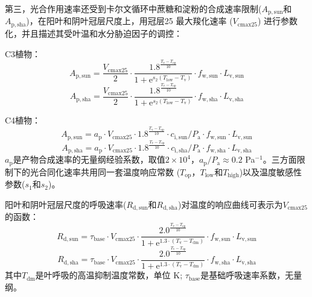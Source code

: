 第三，光合作用速率还受到卡尔文循环中蔗糖和淀粉的合成速率限制($A_{\mathrm{p,sun}}$和$A_{\mathrm{p,sha}}$)，在阳叶和阴叶冠层尺度上，用冠层25 \textcelsius 最大羧化速率 ($V_{\mathrm{cmax25}}$) 进行参数化，并且描述其受叶温和水分胁迫因子的调控：

C3植物：
\begin{equation}\label{A_e_a_sun}
A_{\mathrm{p,sun}}=\frac{V_{\mathrm{cmax 25}}}{2} \cdot \frac{1.8^{\frac{T_{\mathrm{{v }}}-T_{\mathrm{o p}}}{10}}}{1+{\mathrm e}^{s_{\mathrm{2}}\left(T_{\mathrm{{low }}}-T_{\mathrm{{v }}}\right)}} \cdot f_{\mathrm{w,sun}} \cdot L_{\mathrm{v,sun}}
\end{equation}
\begin{equation}\label{A_e_a_sha}
A_{\mathrm{p,sha}}=\frac{V_{\mathrm{cmax 25}}}{2} \cdot \frac{1.8^{\frac{T_{\mathrm{{v }}}-T_{\mathrm{o p}}}{10}}}{1+{\mathrm e}^{s_{\mathrm{2}}\left(T_{\mathrm{{low }}}-T_{\mathrm{{v }}}\right)}} \cdot f_{\mathrm{w,sha}} \cdot L_{\mathrm{v,sha}}
\end{equation}

C4植物：
\begin{equation}\label{A_e_b_sun}
A_{\mathrm{p,sun}}=a_{\mathrm{p}} \cdot V_{\mathrm{cmax 25}} \cdot 1.8^{\frac{T_{\mathrm{{v }}}-T_{\mathrm{op}}}{10}} \cdot c_{\mathrm{i,sun}}/P_{\mathrm {a}} \cdot f_{\mathrm{w,sun}} \cdot L_{\mathrm{v,sun}}
\end{equation}
\begin{equation}\label{A_e_b_sha}
A_{\mathrm{p,sha}}=a_{\mathrm{p}} \cdot V_{\mathrm{cmax 25}} \cdot 1.8^{\frac{T_{\mathrm{{v }}}-T_{\mathrm{op}}}{10}} \cdot c_{\mathrm{i,sha}}/P_{\mathrm {a}} \cdot f_{\mathrm{w,sha}} \cdot L_{\mathrm{v,sha}}
\end{equation}
$a_{\mathrm{p}}$是产物合成速率的无量纲经验系数，取值$2\times10^4$，$a_{\mathrm{p}}/P_{\mathrm {a}}\approx 0.2$ Pa$^{-1}$。三方面限制下的光合同化速率共用同一套温度响应常数 ($T_{\mathrm{op}}$，$T_{\mathrm{low}}$和$T_{\mathrm{high}}$)以及温度敏感性参数($s_1$和$s_2$)。


阳叶和阴叶冠层尺度的呼吸速率($R_{\mathrm{d,sun}}$和$R_{\mathrm{d,sha}}$)对温度的响应曲线可表示为$V_{\mathrm{cmax25}}$的函数：
\begin{equation}\label{R_d1_sun}
R_{\mathrm{d,sun}}=\tau_{\mathrm{{base }}} \cdot V_{\mathrm{cmax 25}} \cdot \frac{2.0^{\frac{T_{\mathrm{v}}-T_{\mathrm{op}}}{10}}}{1+{\mathrm e}^{1.3 \cdot\left(T_{\mathrm{v}}-T_{\mathrm{d m}}\right)}} \cdot f_{\mathrm{w,sun}} \cdot L_{\mathrm{v,sun}}
\end{equation}
\begin{equation}\label{R_d1_sha}
R_{\mathrm{d,sha}}=\tau_{\mathrm{{base }}} \cdot V_{\mathrm{cmax 25}} \cdot \frac{2.0^{\frac{T_{\mathrm{v}}-T_{\mathrm{op}}}{10}}}{1+{\mathrm e}^{1.3 \cdot\left(T_{\mathrm{v}}-T_{\mathrm{d m}}\right)}} \cdot f_{\mathrm{w,sha}} \cdot L_{\mathrm{v,sha}}
\end{equation}
其中$T_{\mathrm{dm}}$是叶呼吸的高温抑制温度常数，单位 K; $\tau_{\mathrm{base}}$是基础呼吸速率系数，无量纲。

